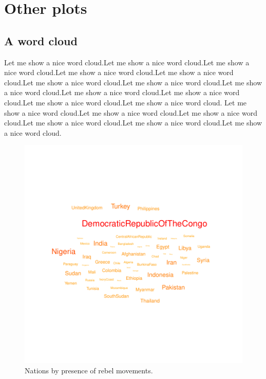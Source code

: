 \documentclass[11pt]{article}
\begin{document}


\section{Other plots}\label{otherPlots}

\subsection{A word cloud}\label{wordPlot}

Let me show a nice word cloud.Let me show a nice word cloud.Let me show a nice word cloud.Let me show a nice word cloud.Let me show a nice word cloud.Let me show a nice word cloud.Let me show a nice word cloud.Let me show a nice word cloud.Let me show a nice word cloud.Let me show a nice word cloud.Let me show a nice word cloud.Let me show a nice word cloud. Let me show a nice word cloud.Let me show a nice word cloud.Let me show a nice word cloud.Let me show a nice word cloud.Let me show a nice word cloud.Let me show a nice word cloud.




\begin{figure}[h]
\centering
\begin{adjustbox}{width=10cm,height=10cm,clip,trim=0cm 2cm 0cm 2cm} 
\includegraphics{WorkInR_forPrinter-theCloudPlot}
\end{adjustbox}
\caption{Nations by presence of rebel movements.}  
\label{theCloudPlot} 
\end{figure}
\end{document}

